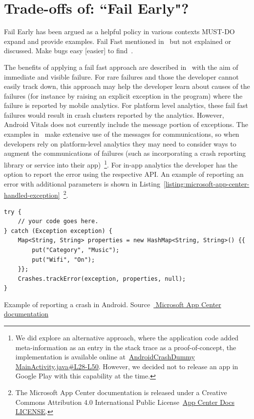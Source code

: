 \section{Trade-offs of: ``Fail Early"?}
Fail Early has been argued as a helpful policy in various contexts MUST-DO expand and provide examples. Fail Fast mentioned in~\citep{gray1986_why_do_computers_stop_and_what_can_be_done_about_it} but not explained or discussed. Make bugs easy [easier] to find~\citep{shore2004_fail_fast_software_debugging}.

The benefits of applying a fail fast approach are described in~\citep{shore2004_fail_fast_software_debugging} with the aim of immediate and visible failure. For rare failures and those the developer cannot easily track down, this approach may help the developer learn about causes of the failures (for instance by raising an explicit exception in the program) where the failure is reported by mobile analytics. For platform level analytics, these fail fast failures would result in crash clusters reported by the analytics. However, Android Vitals does not currently include the message portion of exceptions. The examples in~\citep{shore2004_fail_fast_software_debugging} make extensive use of the messages for communications, so when developers rely on platform-level analytics they may need to consider ways to augment the communications of failures (such as incorporating a crash reporting library or service into their app)~\footnote{We did explore an alternative approach, where the application code added meta-information as an entry in the stack trace as a proof-of-concept, the implementation is available online at~\href{https://github.com/ISNIT0/AndroidCrashDummy/blob/cfa7f0817c436d7e657741e0a5d9a76644e5a898/app/src/main/java/com/example/user/androidtestapp/MainActivity.java\#L28-L50}{AndroidCrashDummy MainActivity.java\#L28-L50}.  However, we decided not to release an app in Google Play with this capability at the time.}. For in-app analytics the developer has the option to report the error using the respective API. An example of reporting an error with additional parameters is shown in Listing~\ref{listing:microsoft-app-center-handled-exception}~\footnote{The Microsoft App Center documentation is released under a Creative Commons Attribution 4.0 International Public License~\href{https://github.com/MicrosoftDocs/appcenter-docs/blob/live/LICENSE}{App Center Docs LICENSE}.}.

\begin{listing}
\begin{verbatim}
try {
    // your code goes here.
} catch (Exception exception) {
    Map<String, String> properties = new HashMap<String, String>() {{
        put("Category", "Music");
        put("Wifi", "On");
    }};
    Crashes.trackError(exception, properties, null);
}
\end{verbatim}
\caption[Microsoft AppCenter: example of reporting a crash in Android]{Example of reporting a crash in Android.  Source~\href{https://docs.microsoft.com/en-us/appcenter/sdk/crashes/android}{ Microsoft App Center documentation}}
\label{listing:microsoft-app-center-handled-exception}
\end{listing}


